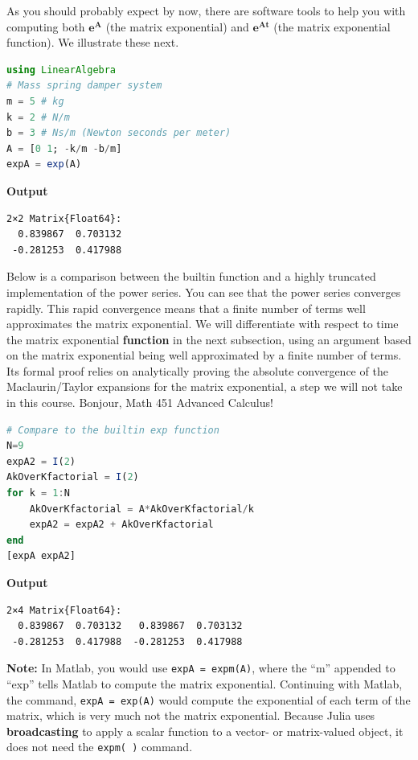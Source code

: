  As you should probably expect by now, there are software tools to help you with computing both $\bm{e^A}$ (the matrix exponential) and $\bm{e^{At}}$ (the matrix exponential function). We illustrate these next.

 \bigskip

\begin{lstlisting}[language=Julia,style=mystyle]
using LinearAlgebra
# Mass spring damper system
m = 5 # kg
k = 2 # N/m
b = 3 # Ns/m (Newton seconds per meter)
A = [0 1; -k/m -b/m]
expA = exp(A)
\end{lstlisting}
\textbf{Output} 
\begin{verbatim}
2×2 Matrix{Float64}:
  0.839867  0.703132
 -0.281253  0.417988
\end{verbatim}

\bigskip
Below is a comparison between the builtin function and a highly truncated implementation of the power series. You can see that the power series converges rapidly. This rapid convergence means that a finite number of terms well approximates the matrix exponential. We will differentiate with respect to time the matrix exponential \textbf{function} in the next subsection, using an argument based on the matrix exponential being well approximated by a finite number of terms. Its formal proof relies on analytically proving the absolute convergence of the Maclaurin/Taylor expansions for the matrix exponential, a step we will not take in this course. Bonjour, Math 451 Advanced Calculus!\\

\begin{lstlisting}[language=Julia,style=mystyle]
# Compare to the builtin exp function
N=9
expA2 = I(2)
AkOverKfactorial = I(2)
for k = 1:N
    AkOverKfactorial = A*AkOverKfactorial/k
    expA2 = expA2 + AkOverKfactorial    
end
[expA expA2]
\end{lstlisting}
\textbf{Output} 
\begin{verbatim}
2×4 Matrix{Float64}:
  0.839867  0.703132   0.839867  0.703132
 -0.281253  0.417988  -0.281253  0.417988
\end{verbatim}


\bigskip \textbf{Note:} In Matlab, you would use \texttt{expA = expm(A)}, where the ``m'' appended to ``exp'' tells Matlab to compute the matrix exponential. Continuing with Matlab, the command, \texttt{expA = exp(A)} would compute the exponential of each term of the matrix, which is very much not the matrix exponential. Because Julia uses \textbf{broadcasting} to apply a scalar function to a vector- or matrix-valued object, it does not need the \texttt{expm( )} command. 

